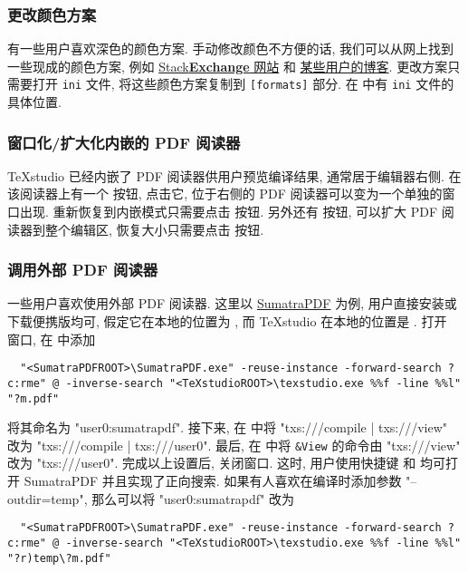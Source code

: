 \subsubsection{更改颜色方案}

有一些用户喜欢深色的颜色方案.
手动修改颜色不方便的话, 我们可以从网上找到一些现成的颜色方案,
例如
\href{https://tex.stackexchange.com/questions/108315/how-can-i-set-a-dark-theme-in-texstudio}{\textsf{Stack\textbf{Exchange}} 网站}%
和%
\href{https://robjhyndman.com/hyndsight/dark-themes-for-writing/}{某些用户的博客}.
更改方案只需要打开 \texttt{ini} 文件,
将这些颜色方案复制到 \texttt{[formats]} 部分.
在 
中有 \texttt{ini} 文件的具体位置.

\subsubsection{窗口化/扩大化内嵌的 PDF 阅读器}

\TeX studio 已经内嵌了 PDF 阅读器供用户预览编译结果,
通常居于编辑器右侧.
在该阅读器上有一个  按钮,
点击它,
位于右侧的 PDF 阅读器可以变为一个单独的窗口出现.
重新恢复到内嵌模式只需要点击  按钮.
另外还有  按钮,
可以扩大 PDF 阅读器到整个编辑区,
恢复大小只需要点击  按钮.

\subsubsection{调用外部 PDF 阅读器}

一些用户喜欢使用外部 PDF 阅读器.
这里以 \href{https://www.sumatrapdfreader.org/free-pdf-reader.html}{SumatraPDF} 为例,
用户直接安装或下载便携版均可,
假定它在本地的位置为 ,
而 \TeX studio 在本地的位置是 .
打开  窗口,
在  中添加
\begin{lstlisting}
  "<SumatraPDFROOT>\SumatraPDF.exe" -reuse-instance -forward-search ?c:rme" @ -inverse-search "<TeXstudioROOT>\texstudio.exe %%f -line %%l" "?m.pdf"
\end{lstlisting}
将其命名为 "user0:sumatrapdf".
接下来, 在  中将
"txs:///compile | txs:///view" 改为
"txs:///compile | txs:///user0".
最后, 在  中将 \texttt{\&View} 的命令由
"txs:///view" 改为 "txs:///user0".
完成以上设置后,
关闭窗口.
这时,
用户使用快捷键  和  均可打开 SumatraPDF 并且实现了正向搜索.
如果有人喜欢在编译时添加参数 "--outdir=temp",
那么可以将 "user0:sumatrapdf" 改为
\begin{lstlisting}
  "<SumatraPDFROOT>\SumatraPDF.exe" -reuse-instance -forward-search ?c:rme" @ -inverse-search "<TeXstudioROOT>\texstudio.exe %%f -line %%l" "?r)temp\?m.pdf"
\end{lstlisting}

